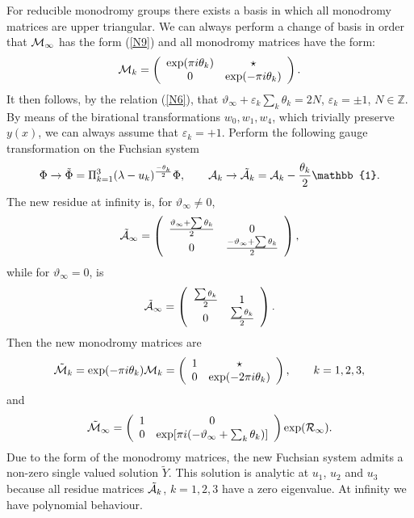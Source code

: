 \documentclass[12pt]{article}
\def\thi{{\vartheta_\infty}}
\newcommand{\ID}{\mathbb{1}}
\newcommand {\interi}{\mathbb Z}
\theoremstyle{definition}
\theoremstyle{theorem}
\begin{document}
For reducible monodromy groups there exists a basis in which all
monodromy matrices are upper triangular. We can always perform
a change of basis in order that ${\cal M}_\infty$ has the form (\ref{N9}) 
and all monodromy matrices have the form:
$$
{\cal M}_k=\left(\begin{array}{cc}
\exp(\pi i\theta_k)&\star\\  0&\exp(-\pi i\theta_k)\\ 
\end{array}\right).
$$ 
It then follows, by the relation (\ref{N6}), that 
$\thi+\varepsilon_k\sum_k\theta_k=2 N$, $\varepsilon_k=\pm1$, $N\in\interi$.
By means of the birational transformations $w_0,w_1,w_4$,
which trivially preserve $y(x)$, we can always assume that $\varepsilon_k=+1$.
Perform the following gauge transformation on the Fuchsian system
$$
\Phi\to\tilde\Phi=\Pi_{k=1}^3(\lambda-u_k)^{-\theta_k\over2}\Phi,
\qquad
{\cal A}_k\to\tilde{\cal A}_k={\cal A}_k-{\theta_k\over2}\ID.
$$ 
The new residue at infinity is, for $\thi\neq0$,
$$
\tilde{\cal A}_\infty=\left(\begin{array}{cc}
{\thi+\sum\theta_k\over 2}&0\\
0&{-\thi+\sum\theta_k\over 2}\\ \end{array}\right),
$$
while for $\thi=0$, is
$$
\tilde{\cal A}_\infty=\left(\begin{array}{cc}
{\sum\theta_k\over 2}&1\\
0&{\sum\theta_k\over 2}\\ \end{array}\right).
$$
Then the new monodromy matrices are
$$
\tilde{\cal M}_k=\exp(-\pi i\theta_k){\cal M}_k
=\left(\begin{array}{cc}1&\star\\ 0&\exp(-2\pi i\theta_k)\\
\end{array}\right),\qquad k=1,2,3,
$$
and 
$$
\tilde{\cal M}_\infty=\left(\begin{array}{cc}1&0\\ 0& 
\exp[\pi i(-\thi+\sum_k\theta_k)]\\
\end{array}\right)\exp({\cal R}_\infty).
$$
Due to the form of the monodromy matrices,
the new Fuchsian system admits a non-zero
single valued solution $\tilde Y$. This solution is analytic at $u_1$,
$u_2$ and $u_3$ because all residue matrices $\tilde{\cal A}_k$, $k=1,2,3$
have a zero eigenvalue. At infinity we have polynomial behaviour.
\end{document}
